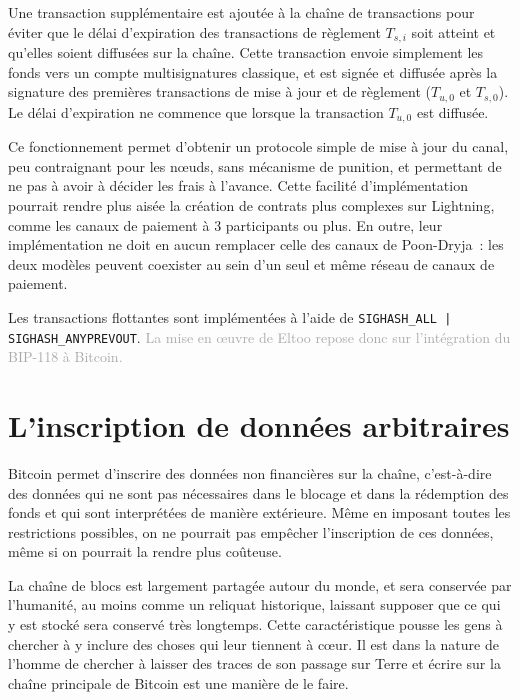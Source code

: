 Une transaction supplémentaire est ajoutée à la chaîne de transactions pour éviter que le délai d'expiration des transactions de règlement $T_{s,i}$ soit atteint et qu'elles soient diffusées sur la chaîne. Cette transaction envoie simplement les fonds vers un compte multisignatures classique, et est signée et diffusée après la signature des premières transactions de mise à jour et de règlement ($T_{u,0}$ et $T_{s,0}$). Le délai d'expiration ne commence que lorsque la transaction $T_{u,0}$ est diffusée.

Ce fonctionnement permet d'obtenir un protocole simple de mise à jour du canal, peu contraignant pour les nœuds, sans mécanisme de punition, et permettant de ne pas à avoir à décider les frais à l'avance. Cette facilité d'implémentation pourrait rendre plus aisée la création de contrats plus complexes sur Lightning, comme les canaux de paiement à 3 participants ou plus. En outre, leur implémentation ne doit en aucun remplacer celle des canaux de Poon-Dryja~: les deux modèles peuvent coexister au sein d'un seul et même réseau de canaux de paiement.

Les transactions flottantes sont implémentées à l'aide de \texttt{SIGHASH\_ALL | SIGHASH\_ANYPREVOUT}. \textcolor{darkgray}{La mise en œuvre de Eltoo repose donc sur l'intégration du BIP-118 à Bitcoin.}

\section*{L'inscription de données arbitraires}

Bitcoin permet d'inscrire des données non financières sur la chaîne, c'est-à-dire des données qui ne sont pas nécessaires dans le blocage et dans la rédemption des fonds et qui sont interprétées de manière extérieure. Même en imposant toutes les restrictions possibles, on ne pourrait pas empêcher l'inscription de ces données, même si on pourrait la rendre plus coûteuse.

La chaîne de blocs est largement partagée autour du monde, et sera conservée par l'humanité, au moins comme un reliquat historique, laissant supposer que ce qui y est stocké sera conservé très longtemps. Cette caractéristique pousse les gens à chercher à y inclure des choses qui leur tiennent à cœur. Il est dans la nature de l'homme de chercher à laisser des traces de son passage sur Terre et écrire sur la chaîne principale de Bitcoin est une manière de le faire.

